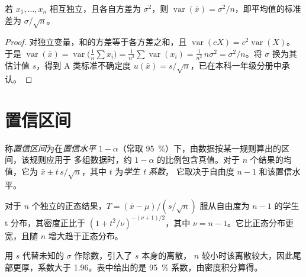 \begin{theorem}[平均值的方差]\label{thm:b2:measurement-statistics:mean-variance}
若 $x_1, \dots, x_n$ 相互独立，且各自方差为 $\sigma^2$，则 $\operatorname{var}(\bar x) =
\sigma^2/n$，即平均值的标准差为 $\sigma/\sqrt n$。
\end{theorem}

\begin{proof}
对独立变量，和的方差等于各方差之和，且
$\operatorname{var}(cX) = c^2\operatorname{var}(X)$。于是 $\operatorname{var}(\bar x) =
\operatorname{var}\bigl(\tfrac1n\sum x_i\bigr) = \tfrac{1}{n^2}\sum\operatorname{var}(x_i) =
\tfrac{1}{n^2}\,n\sigma^2 = \sigma^2/n$。将 $\sigma$ 换为其估计值 $s$，得到
A 类标准不确定度 $u(\bar x) = s/\sqrt n$，已在本科一年级分册中承认。
\end{proof}

\section{置信区间}

\begin{definition}[置信区间]\label{def:b2:measurement-statistics:confidence}
称\emph{置信区间}为在\emph{置信水平}
$1 - \alpha$（常取 95~\%）下，由数据按某一规则算出的区间，该规则应用于
多组数据时，约 $1 - \alpha$ 的比例包含真值。对于 $n$ 个结果的均值，它为
$\bar x \pm t\,s/\sqrt n$，其中 $t$ 为\emph{学生 t 系数}，
它取决于自由度 $n - 1$ 和该置信水平。
\end{definition}

\begin{proposition}[学生 t 分布]\label{prop:b2:measurement-statistics:student}
对于 $n$ 个独立的正态结果，$T = (\bar x - \mu)/(s/\sqrt n)$ 服从自由度为
$n - 1$ 的学生 t 分布，其密度正比于 $(1 + t^2/\nu)^{-(\nu+1)/2}$，其中
$\nu = n - 1$。它比正态分布更宽，且随 $n$ 增大趋于正态分布。
\end{proposition}

\admitted

用 $s$ 代替未知的 $\sigma$ 作除数，引入了 $s$ 本身的离散，
$n$ 较小时该离散较大，因此尾部更厚，系数大于 1.96。表中给出的是 95~\%
系数，由密度积分算得。

